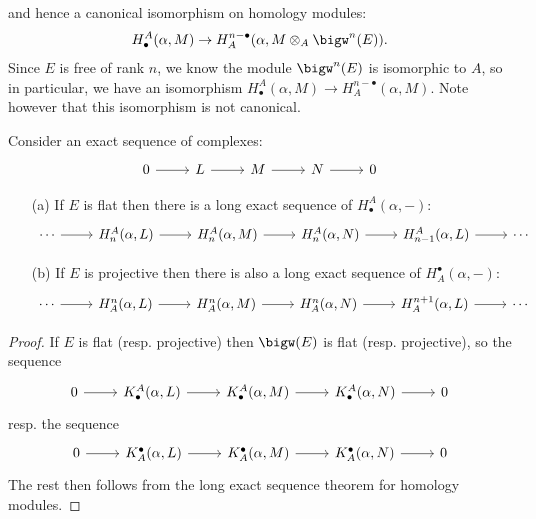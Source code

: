 and hence a canonical isomorphism on homology modules:
\begin{align}\label{Koszul complex dual prop}
H^A_\bullet(\alpha,M)\to H_A^{n-\bullet}(\alpha,M\otimes_A\bigw^n(E)).
\end{align}
Since $E$ is free of rank $n$, we know the module $\bigw^n(E)$ is isomorphic to $A$, so in particular, we have an isomorphism $H_\bullet^A(\alpha,M)\to H_A^{n-\bullet}(\alpha,M)$. Note however that this isomorphism is not canonical.
\begin{proposition}\label{Koszul complex long exact sequence}
Consider an exact sequence of complexes:
\[\begin{tikzcd}
0\ar[r]&L\ar[r]&M\ar[r]&N\ar[r]&0
\end{tikzcd}\]
\begin{itemize}
\item[(a)] If $E$ is flat then there is a long exact sequence of $H_\bullet^A(\alpha,-)$:
\[\begin{tikzcd}
\cdots\ar[r]&H_n^A(\alpha,L)\ar[r]&H_n^A(\alpha,M)\ar[r]&H_n^A(\alpha,N)\ar[r]&H_{n-1}^A(\alpha,L)\ar[r]&\cdots
\end{tikzcd}\] 
\item[(b)] If $E$ is projective then there is also a long exact sequence of $H^\bullet_A(\alpha,-)$:
\[\begin{tikzcd}
\cdots\ar[r]&H^n_A(\alpha,L)\ar[r]&H^n_A(\alpha,M)\ar[r]&H^n_A(\alpha,N)\ar[r]&H^{n+1}_A(\alpha,L)\ar[r]&\cdots
\end{tikzcd}\] 
\end{itemize}
\end{proposition}
\begin{proof}
If $E$ is flat (resp. projective) then $\bigw(E)$ is flat (resp. projective), so the sequence
\[\begin{tikzcd}
0\ar[r]&K_\bullet^A(\alpha,L)\ar[r]&K_\bullet^A(\alpha,M)\ar[r]&K_\bullet^A(\alpha,N)\ar[r]&0
\end{tikzcd}\]
resp. the sequence
\[\begin{tikzcd}
0\ar[r]&K^\bullet_A(\alpha,L)\ar[r]&K^\bullet_A(\alpha,M)\ar[r]&K^\bullet_A(\alpha,N)\ar[r]&0
\end{tikzcd}\]
The rest then follows from the long exact sequence theorem for homology modules.
\end{proof}
